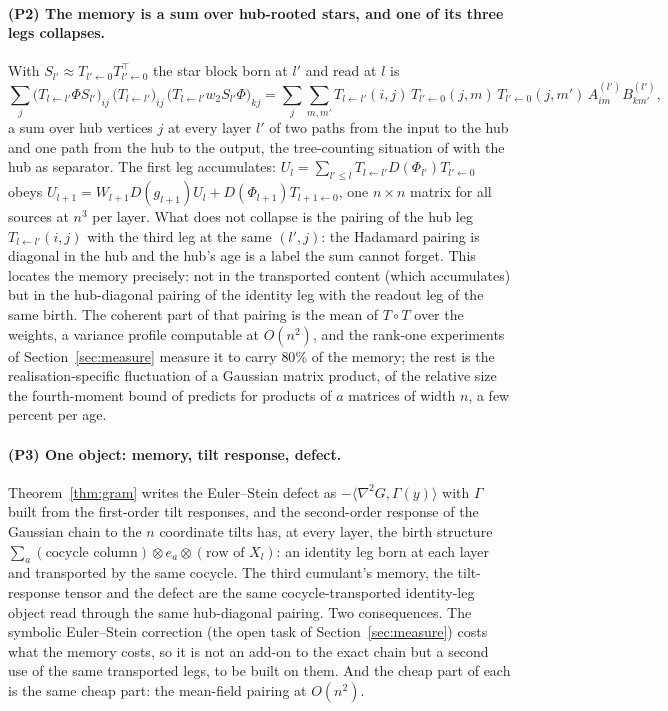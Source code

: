 \paragraph{(P2) The memory is a sum over hub-rooted stars, and one of its three legs collapses.} With
$S_{l'}\approx T_{l'\leftarrow0}T_{l'\leftarrow0}^{\!\top}$ the star block born at $l'$ and read at $l$ is
\[
 \sum_{j}\big(T_{l\leftarrow l'}\Phi S_{l'}\big)_{ij}\,\big(T_{l\leftarrow l'}\big)_{ij}\,\big(T_{l\leftarrow l'}w_2S_{l'}\Phi\big)_{kj}
 =\sum_j\sum_{m,m'}T_{l\leftarrow l'}(i,j)\,T_{l'\leftarrow0}(j,m)\,T_{l'\leftarrow0}(j,m')\,A^{(l')}_{im}B^{(l')}_{km'},
\]
a sum over hub vertices $j$ at every layer $l'$ of two paths from the input to the hub and one path from the hub
to the output, the tree-counting situation of \cite{ext} with the hub as separator. The first leg accumulates:
$U_l=\sum_{l'\le l}T_{l\leftarrow l'}D(\Phi_{l'})T_{l'\leftarrow0}$ obeys $U_{l+1}=W_{l+1}D(g_{l+1})U_l+D(\Phi_{l+1})T_{l+1\leftarrow0}$,
one $n\times n$ matrix for all sources at $n^3$ per layer. What does not collapse is the pairing of the hub leg
$T_{l\leftarrow l'}(i,j)$ with the third leg at the same $(l',j)$: the Hadamard pairing is diagonal in the hub and
the hub's age is a label the sum cannot forget. This locates the memory precisely: not in the transported
content (which accumulates) but in the hub-diagonal pairing of the identity leg with the readout leg of the same
birth. The coherent part of that pairing is the mean of $T\circ T$ over the weights, a variance profile
computable at $O(n^2)$, and the rank-one experiments of Section~\ref{sec:measure} measure it to carry $80\%$ of
the memory; the rest is the realisation-specific fluctuation of a Gaussian matrix product, of the relative size
the fourth-moment bound of \cite{ext} predicts for products of $a$ matrices of width $n$, a few percent per age.

\paragraph{(P3) One object: memory, tilt response, defect.} Theorem~\ref{thm:gram} writes the Euler--Stein defect as
$-\langle\nabla^2G,\Gamma(y)\rangle$ with $\Gamma$ built from the first-order tilt responses, and the second-order
response of the Gaussian chain to the $n$ coordinate tilts has, at every layer, the birth structure
$\sum_a (\text{cocycle column})\otimes e_a\otimes(\text{row of }X_l)$: an identity leg born at each layer and
transported by the same cocycle. The third cumulant's memory, the tilt-response tensor and the defect are the
same cocycle-transported identity-leg object read through the same hub-diagonal pairing. Two consequences. The
symbolic Euler--Stein correction (the open task of Section~\ref{sec:measure}) costs what the memory costs, so it
is not an add-on to the exact chain but a second use of the same transported legs, to be built on them. And the
cheap part of each is the same cheap part: the mean-field pairing at $O(n^2)$.

